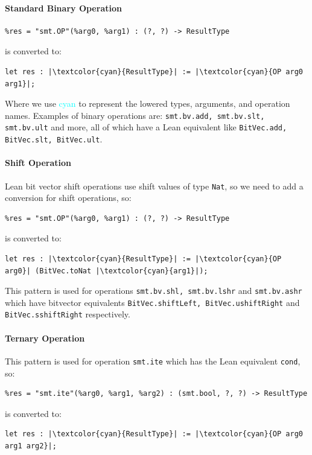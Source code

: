 \paragraph{Standard Binary Operation}
\begin{verbatim}
%res = "smt.OP"(%arg0, %arg1) : (?, ?) -> ResultType
\end{verbatim}
is converted to:
\begin{verbatim}
let res : |\textcolor{cyan}{ResultType}| := |\textcolor{cyan}{OP arg0 arg1}|;
\end{verbatim}
Where we use \textcolor{cyan}{cyan} to represent the lowered types, arguments, and operation names.
%
Examples of binary operations are: \texttt{smt.bv.add, smt.bv.slt, smt.bv.ult} and more, all of which
have a Lean equivalent like \texttt{BitVec.add, BitVec.slt, BitVec.ult}.

\paragraph{Shift Operation}
Lean bit vector shift operations use shift values of type \texttt{Nat}, so we need to add a 
conversion for shift operations, so:
\begin{verbatim}
%res = "smt.OP"(%arg0, %arg1) : (?, ?) -> ResultType
\end{verbatim}
is converted to:
\begin{verbatim}
let res : |\textcolor{cyan}{ResultType}| := |\textcolor{cyan}{OP arg0}| (BitVec.toNat |\textcolor{cyan}{arg1}|);
\end{verbatim}

This pattern is used for operations \texttt{smt.bv.shl, smt.bv.lshr} and \texttt{smt.bv.ashr} which have
bitvector equivalents \texttt{BitVec.shiftLeft, BitVec.ushiftRight} and \\ \texttt{BitVec.sshiftRight} respectively.

\paragraph{Ternary Operation}

This pattern is used for operation \texttt{smt.ite} which has the Lean equivalent \texttt{cond}, so:
\begin{verbatim}
%res = "smt.ite"(%arg0, %arg1, %arg2) : (smt.bool, ?, ?) -> ResultType
\end{verbatim}
is converted to:
\begin{verbatim}
let res : |\textcolor{cyan}{ResultType}| := |\textcolor{cyan}{OP arg0 arg1 arg2}|;
\end{verbatim}

